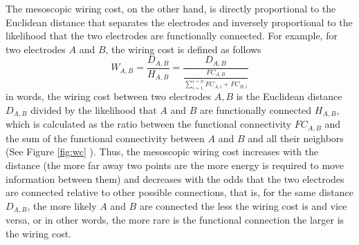 \documentclass[11pt, onecolumn]{article}
\begin{document}
The mesoscopic wiring cost, on the other hand, is directly proportional to the Euclidean distance that separates the electrodes and inversely proportional to the likelihood that the two electrodes are functionally connected. For example, for two electrodes $A$ and $B$, the wiring cost is defined as follows
\begin{equation}
 W_{A,B} = \frac{D_{A,B}}{H_{A,B}} =  \frac{D_{A,B}}{\frac{FC_{A,B}}{\sum_{i=1}^{i=n}FC_{A,i} + FC_{B,i}}}
 \label{eq:mesowc}
\end{equation}
in words, the wiring cost between two electrodes $A,B$ is the Euclidean distance $D_{A,B}$ divided by the likelihood that $A$ and $B$ are functionally connected $H_{A,B}$, which is calculated as the ratio between the functional connectivity $FC_{A,B}$ and the sum of the functional connectivity between $A$ and $B$ and all their neighbors (See Figure \ref{fig:wc} ). Thus, the mesoscopic wiring cost increases with the distance (the more far away two points are the more energy is required to move information between them) and decreases with the odds that the two electrodes are connected relative to other possible connections, that is, for the same distance $D_{A,B}$, the more likely $A$ and $B$ are connected the less the wiring cost is and vice versa, or in other words, the more rare is the functional connection the larger is the wiring cost. 
\end{document}
